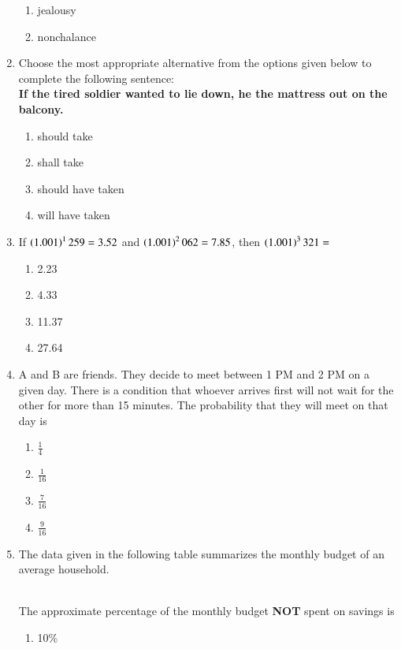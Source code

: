 \documentclass[journal]{IEEEtran}
\numberwithin{equation}{enumi}
\numberwithin{figure}{enumi}
\begin{document}
\begin{enumerate}
\begin{enumerate}
			\item jealousy
			\item nonchalance
		\end{enumerate}
\item Choose the most appropriate alternative from the options given below to complete the following sentence: \\
	\textbf{If the tired soldier wanted to lie down, he \underline{\hspace{1cm}} the mattress out on the balcony.}
		\begin{enumerate}
			\item should take
			\item shall take
			\item should have taken
			\item will have taken
		\end{enumerate}
\item If $\left(1.001\right)^1259 = 3.52$ and $\left(1.001\right)^2062 = 7.85$, then $\left(1.001\right)^3321 =$
	\begin{enumerate}                                                                               
		\item 2.23
		\item 4.33
		\item 11.37
		\item 27.64
	\end{enumerate}
\item A and B are friends. They decide to meet between 1 PM and 2 PM on a given day. There is a condition that whoever arrives first will not wait for the other for more than 15 minutes. The probability that they will meet on that day is
	\begin{enumerate}
		\item $\frac{1}{4}$
		\item $\frac{1}{16}$
		\item $\frac{7}{16}$
		\item $\frac{9}{16}$
	\end{enumerate}
\item The data given in the following table summarizes the monthly budget of an average household.
	\begin{table}[h!]
		\centering
		
	\end{table} \\
		The approximate percentage of the monthly budget \textbf{NOT} spent on savings is
		\begin{enumerate}
			\item 10\%

\end{enumerate}
\end{enumerate}
\end{document}
